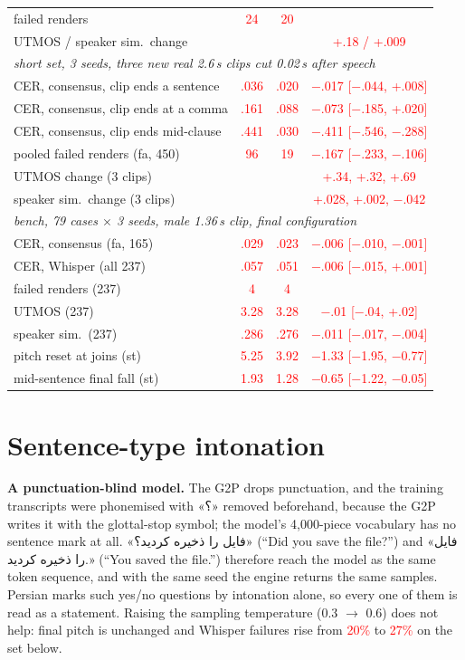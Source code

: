 \documentclass[conference]{IEEEtran}
\newcommand{\fa}[1]{{\persianfont\beginR #1\endR}}
\newcommand{\RES}[1]{\textcolor{red}{#1}}
\begin{document}
\begin{table}[t]
\begin{tabular}{lccc}
failed renders & \RES{24} & \RES{20} & \\
UTMOS / speaker sim.\ change & & & \RES{+.18 / +.009} \\
\midrule
\multicolumn{4}{l}{\emph{short set, 3 seeds, three new real 2.6\,s clips cut 0.02\,s after speech}} \\
CER, consensus, clip ends a sentence & \RES{.036} & \RES{.020} & \RES{$-$.017 [$-$.044, +.008]} \\
CER, consensus, clip ends at a comma & \RES{.161} & \RES{.088} & \RES{$-$.073 [$-$.185, +.020]} \\
CER, consensus, clip ends mid-clause & \RES{.441} & \RES{.030} & \RES{$-$.411 [$-$.546, $-$.288]} \\
pooled failed renders (fa, 450) & \RES{96} & \RES{19} & \RES{$-$.167 [$-$.233, $-$.106]} \\
UTMOS change (3 clips) & & & \RES{+.34, +.32, +.69} \\
speaker sim.\ change (3 clips) & & & \RES{+.028, +.002, $-$.042} \\
\midrule
\multicolumn{4}{l}{\emph{bench, 79 cases $\times$ 3 seeds, male 1.36\,s clip, final configuration}} \\
CER, consensus (fa, 165) & \RES{.029} & \RES{.023} & \RES{$-$.006 [$-$.010, $-$.001]} \\
CER, Whisper (all 237) & \RES{.057} & \RES{.051} & \RES{$-$.006 [$-$.015, +.001]} \\
failed renders (237) & \RES{4} & \RES{4} & \\
UTMOS (237) & \RES{3.28} & \RES{3.28} & \RES{$-$.01 [$-$.04, +.02]} \\
speaker sim.\ (237) & \RES{.286} & \RES{.276} & \RES{$-$.011 [$-$.017, $-$.004]} \\
pitch reset at joins (st) & \RES{5.25} & \RES{3.92} & \RES{$-$1.33 [$-$1.95, $-$0.77]} \\
mid-sentence final fall (st) & \RES{1.93} & \RES{1.28} & \RES{$-$0.65 [$-$1.22, $-$0.05]} \\
\bottomrule
\end{tabular}
\end{table}

\section{Sentence-type intonation}\label{sec:c}
\textbf{A punctuation-blind model.} The G2P drops punctuation, and the training transcripts were phonemised
with \fa{«؟»} removed beforehand, because the G2P writes it with the glottal-stop symbol; the model's
4{,}000-piece vocabulary has no sentence mark at all. \fa{«فایل را ذخیره کردید؟»} (``Did you save the file?'')
and \fa{«فایل را ذخیره کردید.»} (``You saved the file.'') therefore reach the model as the same token
sequence, and with the same seed the engine returns the same samples. Persian marks such yes/no questions
by intonation alone, so every one of them is read as a statement. Raising the sampling temperature
(0.3 $\to$ 0.6) does not help: final pitch is unchanged and Whisper failures rise from \RES{20\%} to
\RES{27\%} on the set below.
\end{document}

